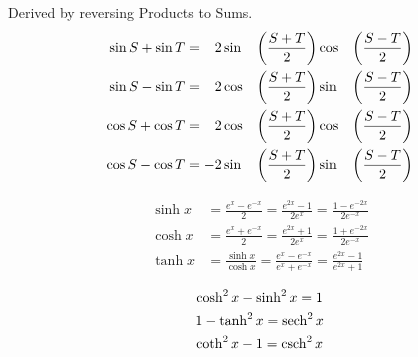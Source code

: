 \begin{multicols}{2}
\begin{CheatsheetEntryFrame}

        Derived by reversing Products to Sums.
        \begin{alignat*}{3}
            \sin{S} + \sin{T} &= \phantom{+} 2 \sin&&{\parens*{\frac{S+T}{2}}} \cos&&{\parens*{\frac{S-T}{2}}} \\
            \sin{S} - \sin{T} &= \phantom{+} 2 \cos&&{\parens*{\frac{S+T}{2}}} \sin&&{\parens*{\frac{S-T}{2}}} \\
            \cos{S} + \cos{T} &= \phantom{+} 2 \cos&&{\parens*{\frac{S+T}{2}}} \cos&&{\parens*{\frac{S-T}{2}}} \\
            \cos{S} - \cos{T} &=          -  2 \sin&&{\parens*{\frac{S+T}{2}}} \sin&&{\parens*{\frac{S-T}{2}}}
        \end{alignat*}

    \end{CheatsheetEntryFrame}

    \pagebreak

    \begin{CheatsheetEntryFrame}

        \begin{align*}
            \sinh{x}
                &= \frac{e^x - e^{-x}}{2}
                = \frac{e^{2x} - 1}{2 e^x}
                = \frac{1 - e^{-2x}}{2 e^{-x}} \\
            \cosh{x}
                &= \frac{e^x + e^{-x}}{2}
                = \frac{e^{2x} + 1}{2 e^x}
                = \frac{1 + e^{-2x}}{2 e^{-x}} \\
            \tanh{x}
                &= \frac{\sinh{x}}{\cosh{x}}
                = \frac{e^x - e^{-x}}{e^x + e^{-x}}
                = \frac{e^{2x} - 1}{e^{2x} + 1}
        \end{align*}

    \end{CheatsheetEntryFrame}

    \MulticolsBreak

    \begin{CheatsheetEntryFrame}

        \begin{gather*}
            \cosh^2{x} - \sinh^2{x} = 1 \\
            1 - \tanh^2{x} = \operatorname{sech}^2{x} \\
            \coth^2{x} - 1 = \operatorname{csch}^2{x}
        \end{gather*}


\end{CheatsheetEntryFrame}
\end{multicols}
